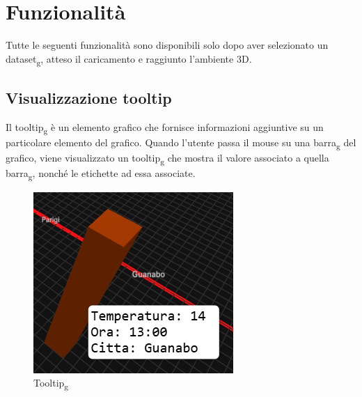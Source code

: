 \section{Funzionalità}
Tutte le seguenti funzionalità sono disponibili solo dopo aver selezionato un
dataset\textsubscript{g}, atteso il caricamento e raggiunto l'ambiente 3D.

\subsection{Visualizzazione tooltip}
Il tooltip\textsubscript{g} è un elemento grafico che fornisce informazioni aggiuntive su un
particolare elemento del grafico. Quando l'utente passa il mouse su una barra\textsubscript{g}
del grafico, viene visualizzato un tooltip\textsubscript{g} che mostra il valore associato a
quella barra\textsubscript{g}, nonché le etichette ad essa associate.
\begin{figure}[ht!]
    \centering
    \includegraphics[scale=0.6]{template/images/tooltip.png}
    \caption{Tooltip\textsubscript{g}}
\end{figure}

